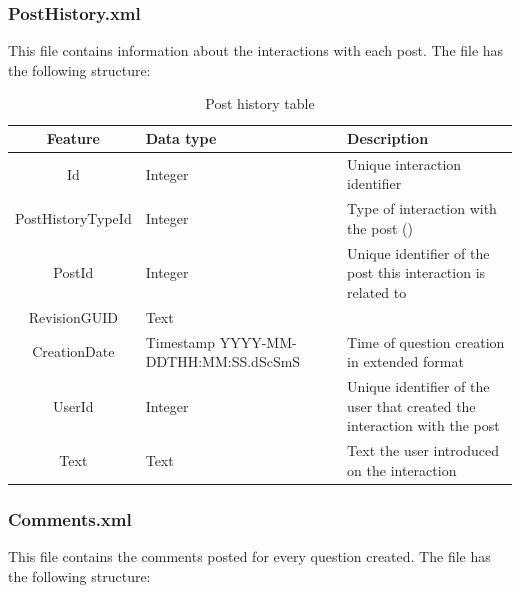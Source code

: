 \documentclass[11pt]{article} %
\begin{document}
\newpage

    \subsubsection{PostHistory.xml}

      This file contains information about the interactions with each post. The file has the following structure:

      \begin{table}[!ht]
        \centering
        \begin{tabular}{|c|p{}|p{}|}
          \hline

          Feature & Data type & Description \\ \hline
          Id & Integer & Unique interaction identifier \\ \hline
          PostHistoryTypeId & Integer & Type of interaction with the post () \\ \hline
          PostId & Integer & Unique identifier of the post this interaction is related to \\ \hline
          RevisionGUID & Text &  \\ \hline
          CreationDate & Timestamp YYYY-MM-DDTHH:MM:SS.dScSmS & Time of question creation in extended format \\ \hline
          UserId & Integer & Unique identifier of the user that created the interaction with the post \\ \hline
          Text & Text & Text the user introduced on the interaction \\ \hline

          \hline
        \end{tabular}
        \caption{Post history table}
        \label{tab:posthistory}
      \end{table}

    \subsubsection{Comments.xml}

      This file contains the comments posted for every question created. The file has the following structure:
\end{document}
